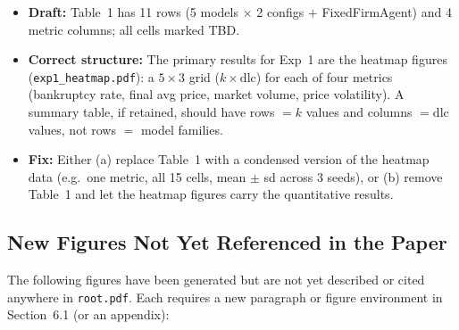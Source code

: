 \documentclass{article}
\begin{document}
\begin{itemize}
  \item \textbf{Draft:} Table~1 has 11 rows (5 models $\times$ 2 configs $+$
        FixedFirmAgent) and 4 metric columns; all cells marked TBD.
  \item \textbf{Correct structure:} The primary results for Exp~1 are the
        heatmap figures (\texttt{exp1\_heatmap.pdf}): a $5 \times 3$ grid
        ($k \times \mathrm{dlc}$) for each of four metrics (bankruptcy rate, final
        avg price, market volume, price volatility).  A summary table, if retained,
        should have rows $= k$ values and columns $= \mathrm{dlc}$ values, not
        rows $=$ model families.
  \item \textbf{Fix:} Either (a) replace Table~1 with a condensed version of the
        heatmap data (e.g.\ one metric, all 15 cells, mean $\pm$ sd across 3
        seeds), or (b) remove Table~1 and let the heatmap figures carry the
        quantitative results.
\end{itemize}

\subsection{New Figures Not Yet Referenced in the Paper}

The following figures have been generated but are not yet described or cited
anywhere in \texttt{root.pdf}.  Each requires a new paragraph or figure
environment in Section~6.1 (or an appendix):
\end{document}

